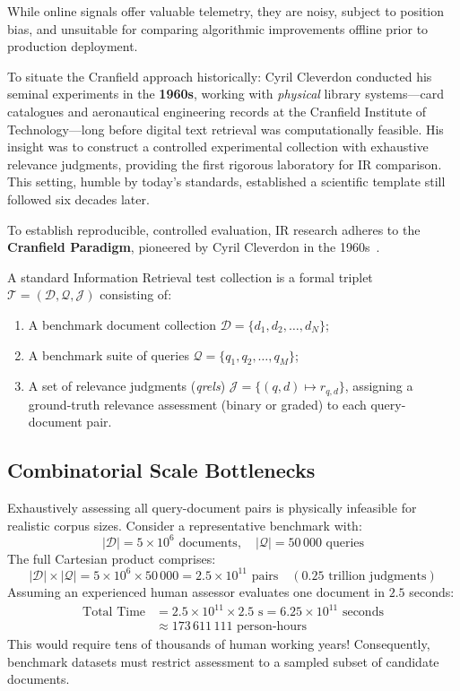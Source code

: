 While online signals offer valuable telemetry, they are noisy, subject to position bias, and unsuitable for comparing algorithmic improvements offline prior to production deployment.

To situate the Cranfield approach historically: Cyril Cleverdon conducted his seminal experiments in the \textbf{1960s}, working with \emph{physical} library systems—card catalogues and aeronautical engineering records at the Cranfield Institute of Technology—long before digital text retrieval was computationally feasible. His insight was to construct a controlled experimental collection with exhaustive relevance judgments, providing the first rigorous laboratory for IR comparison. This setting, humble by today's standards, established a scientific template still followed six decades later.

To establish reproducible, controlled evaluation, IR research adheres to the \textbf{Cranfield Paradigm}, pioneered by Cyril Cleverdon in the 1960s~\cite{cleverdon1967}.

\begin{definition}
A standard Information Retrieval test collection is a formal triplet $\mathcal{T} = (\mathcal{D}, \mathcal{Q}, \mathcal{J})$ consisting of:
\begin{enumerate}
    \item A benchmark document collection $\mathcal{D} = \{d_1, d_2, \dots, d_N\}$;
    \item A benchmark suite of queries $\mathcal{Q} = \{q_1, q_2, \dots, q_M\}$;
    \item A set of relevance judgments (\textit{qrels}) $\mathcal{J} = \{ (q, d) \mapsto r_{q, d} \}$, assigning a ground-truth relevance assessment (binary or graded) to each query-document pair.
\end{enumerate}
\end{definition}

\subsection{Combinatorial Scale Bottlenecks}
Exhaustively assessing all query-document pairs is physically infeasible for realistic corpus sizes.
Consider a representative benchmark with:
\[
|\mathcal{D}| = 5 \times 10^6 \text{ documents}, \quad |\mathcal{Q}| = 50\,000 \text{ queries}
\]
The full Cartesian product comprises:
\[
|\mathcal{D}| \times |\mathcal{Q}| = 5 \times 10^6 \times 50\,000 = 2.5 \times 10^{11} \text{ pairs} \quad (0.25 \text{ trillion judgments})
\]
Assuming an experienced human assessor evaluates one document in $2.5$ seconds:
\begin{align*}
\text{Total Time} &= 2.5 \times 10^{11} \times 2.5\text{ s} = 6.25 \times 10^{11}\text{ seconds} \\
&\approx 173\,611\,111 \text{ person-hours}
\end{align*}
This would require tens of thousands of human working years!
Consequently, benchmark datasets must restrict assessment to a sampled subset of candidate documents.

